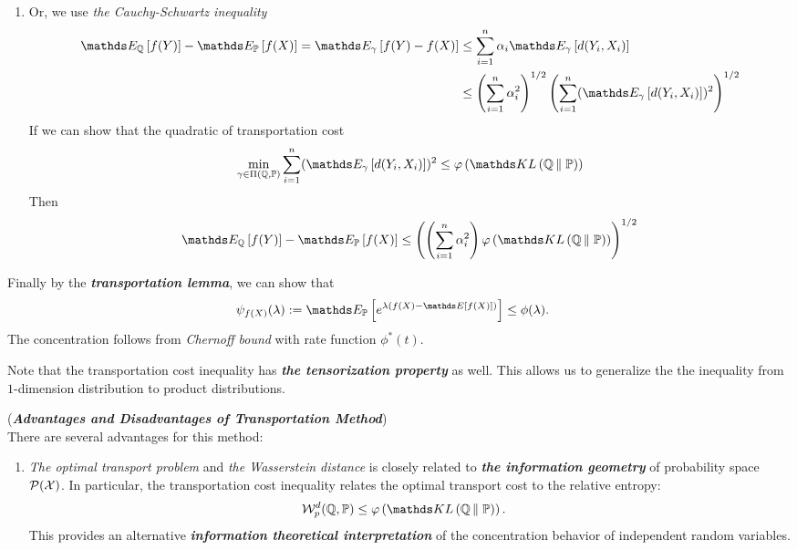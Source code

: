 \documentclass[11pt]{article}
\begin{document}
\begin{enumerate}
\begin{enumerate}
\item Or, we use \emph{the Cauchy-Schwartz inequality}
\begin{align*}
\E{\bQ}{f(Y)} - \E{\bP}{f(X)} = \E{\gamma}{f(Y) - f(X)} &\le \sum_{i=1}^{n}\alpha_i \E{\gamma}{d(Y_i, X_i)}\\
&\le \paren{\sum_{i=1}^{n}\alpha_i^2}^{1/2}\paren{ \sum_{i=1}^{n} (\E{\gamma}{d(Y_i, X_i)})^2}^{1/2}
\end{align*} If we can show that the quadratic of transportation cost
\begin{align*}
 \min_{\gamma \in \Pi(\bQ, \bP)} \sum_{i=1}^{n}(\E{\gamma}{d(Y_i, X_i)})^2 \le \varphi\paren{\kl{\bQ}{\bP}}
\end{align*} Then
\begin{align*}
\E{\bQ}{f(Y)} - \E{\bP}{f(X)} \le \paren{ \paren{\sum_{i=1}^{n}\alpha_i^2}\varphi\paren{\kl{\bQ}{\bP}}}^{1/2}
\end{align*}
\end{enumerate}

Finally by the \emph{\textbf{transportation lemma}}, we can show that 
\begin{align*}
\psi_{f(X)}(\lambda) := \E{\bP}{e^{\lambda (f(X) - \E{}{f(X)})}} &\le \phi(\lambda).
\end{align*} The concentration follows from \emph{Chernoff bound} with rate function $\phi^{*}(t)$.

Note that the transportation cost inequality has \emph{\textbf{the tensorization property}} as well. This allows us to generalize the the inequality from $1$-dimension distribution to product distributions.

\begin{remark} (\textbf{\emph{Advantages and Disadvantages of  Transportation Method}})\\
There are several advantages for this method:
\begin{enumerate}
\item \emph{The optimal transport problem} and \emph{the Wasserstein distance} is closely related to \emph{\textbf{the information geometry}} of probability space ${\mathcal P}({\mathcal X})$. In particular, the transportation cost inequality relates the optimal transport cost to the relative entropy:
\begin{align*}
\cW_{p}^{d}(\bQ, \bP) &\le \varphi\paren{\kl{\bQ}{\bP}}.
\end{align*} This provides an alternative \emph{\textbf{information theoretical interpretation}} of the concentration behavior of independent random variables.


\end{enumerate}
\end{remark}
\end{enumerate}
\end{document}
